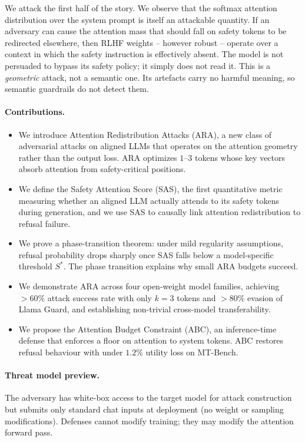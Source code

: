 \documentclass{article}
\theoremstyle{definition}
\theoremstyle{remark}
\begin{document}
We attack the first half of the story. We observe that the softmax attention distribution over the system prompt is itself an attackable quantity. If an adversary can cause the attention mass that should fall on safety tokens to be redirected elsewhere, then RLHF weights -- however robust -- operate over a context in which the safety instruction is effectively absent. The model is not persuaded to bypass its safety policy; it simply does not read it. This is a \emph{geometric} attack, not a semantic one. Its artefacts carry no harmful meaning, so semantic guardrails do not detect them.

\paragraph{Contributions.}
\begin{itemize}
  \item We introduce Attention Redistribution Attacks (ARA), a new class of adversarial attacks on aligned LLMs that operates on the attention geometry rather than the output loss. ARA optimizes $1$--$3$ tokens whose key vectors absorb attention from safety-critical positions.
  \item We define the Safety Attention Score (SAS), the first quantitative metric measuring whether an aligned LLM actually attends to its safety tokens during generation, and we use SAS to causally link attention redistribution to refusal failure.
  \item We prove a phase-transition theorem: under mild regularity assumptions, refusal probability drops sharply once SAS falls below a model-specific threshold $S^*$. The phase transition explains why small ARA budgets succeed.
  \item We demonstrate ARA across four open-weight model families, achieving $>60\%$ attack success rate with only $k{=}3$ tokens and $>80\%$ evasion of Llama Guard, and establishing non-trivial cross-model transferability.
  \item We propose the Attention Budget Constraint (ABC), an inference-time defense that enforces a floor on attention to system tokens. ABC restores refusal behaviour with under $1.2\%$ utility loss on MT-Bench.
\end{itemize}

\paragraph{Threat model preview.} The adversary has white-box access to the target model for attack construction but submits only standard chat inputs at deployment (no weight or sampling modifications). Defenses cannot modify training; they may modify the attention forward pass.
\end{document}
